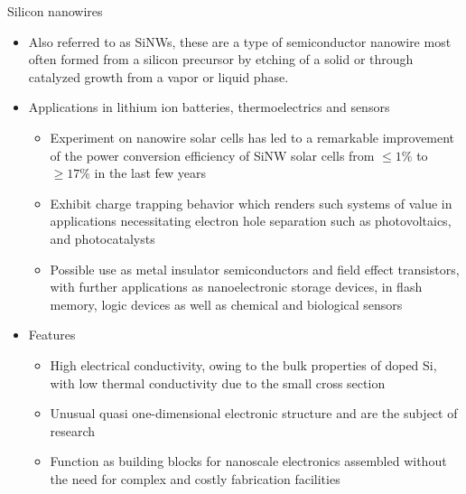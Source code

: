 \documentclass[11pt,dvipsnames,ignorenonframetext,aspectratio=169]{beamer}
\providecommand{\tightlist}{%
  \setlength{\itemsep}{0pt}\setlength{\parskip}{0pt}}
\begin{document}
\begin{frame}{Silicon nanowires}
\protect\hypertarget{silicon-nanowires}{}
\small

\begin{itemize}
\tightlist
\item
  Also referred to as SiNWs, these are a type of semiconductor nanowire
  most often formed from a silicon precursor by etching of a solid or
  through catalyzed growth from a vapor or liquid phase.
\item
  Applications in lithium ion batteries, thermoelectrics and sensors

  \begin{itemize}
  \footnotesize
  \item Experiment on nanowire solar cells has led to a remarkable improvement of the power conversion efficiency of SiNW solar cells from $\leq 1\%$ to $\geq 17\%$ in the last few years
  \item Exhibit charge trapping behavior which renders such systems of value in applications necessitating electron hole separation such as photovoltaics, and photocatalysts
  \item Possible use as metal insulator semiconductors and field effect transistors, with further applications as nanoelectronic storage devices, in flash memory, logic devices as well as chemical and biological sensors
  \end{itemize}
\item
  Features

  \begin{itemize}
  \footnotesize
  \item High electrical conductivity, owing to the bulk properties of doped Si, with low thermal conductivity due to the small cross section
  \item Unusual quasi one-dimensional electronic structure and are the subject of research
  \item Function as building blocks for nanoscale electronics assembled without the need for complex and costly fabrication facilities
  \end{itemize}
\end{itemize}
\end{frame}
\end{document}
